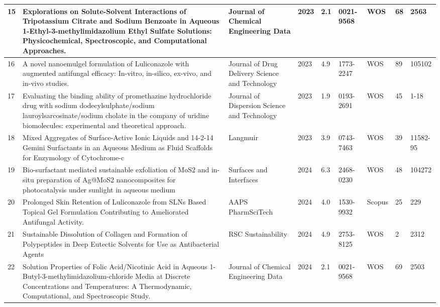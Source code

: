 \documentclass{article}
\begin{document}
\begin{landscape}
\begin{longtable}{|C{1cm}|L{8cm}|C{3cm}|C{1cm}|C{1.5cm}|C{1.6cm}|C{1.5cm}|C{1.5cm}|C{1.5cm}|}
15 & Explorations on Solute-Solvent Interactions of Tripotassium Citrate and Sodium Benzoate in Aqueous 1-Ethyl-3-methylimidazolium Ethyl Sulfate Solutions: Physicochemical, Spectroscopic, and Computational Approaches. & Journal of Chemical Engineering Data & 2023 & 2.1 & 0021-9568 & WOS & 68 & 2563\\
\hline

16 & A novel nanoemulgel formulation of Luliconazole with augmented antifungal efficacy: In-vitro, in-silico, ex-vivo, and in-vivo studies. & Journal of Drug Delivery Science and Technology & 2023 & 4.9 & 1773-2247 & WOS & 89 & 105102\\
\hline

17 & Evaluating the binding ability of promethazine hydrochloride drug with sodium dodecylsulphate/sodium lauroylsarcosinate/sodium cholate in the company of uridine biomolecules: experimental and theoretical approach. & Journal of Dispersion Science and Technology & 2023 & 1.9 & 0193-2691 & WOS & 45 & 1-18\\
\hline

18 & Mixed Aggregates of Surface-Active Ionic Liquids and 14-2-14 Gemini Surfactants in an Aqueous Medium as Fluid Scaffolds for Enzymology of Cytochrome-c & Langmuir & 2023 & 3.9 & 0743-7463 & WOS & 39 & 11582-95\\
\hline

19 & Bio-surfactant mediated sustainable exfoliation of MoS2 and in-situ preparation of Ag@MoS2 nanocomposites for photocatalysis under sunlight in aqueous medium & Surfaces and Interfaces & 2024 & 6.3 & 2468-0230 & WOS & 48 & 104272\\
\hline

20 & Prolonged Skin Retention of Luliconazole from SLNs Based Topical Gel Formulation Contributing to Ameliorated Antifungal Activity. &  AAPS PharmSciTech & 2024 & 4.0 & 1530-9932 & Scopus & 25 & 229\\
\hline

21 & Sustainable Dissolution of Collagen and Formation of Polypeptides in Deep Eutectic Solvents for Use as Antibacterial Agents &  RSC Sustainability & 2024 & 4.9 & 2753-8125 & WOS & 2 & 2312\\
\hline

22 & Solution Properties of Folic Acid/Nicotinic Acid in Aqueous 1-Butyl-3-methylimidazolium-chloride Media at Discrete Concentrations and Temperatures: A Thermodynamic, Computational, and Spectroscopic Study. & Journal of Chemical Engineering Data & 2024 & 2.1 & 0021-9568 & WOS & 69 & 2503 \\
\hline


\end{longtable}
\end{landscape}
\end{document}
